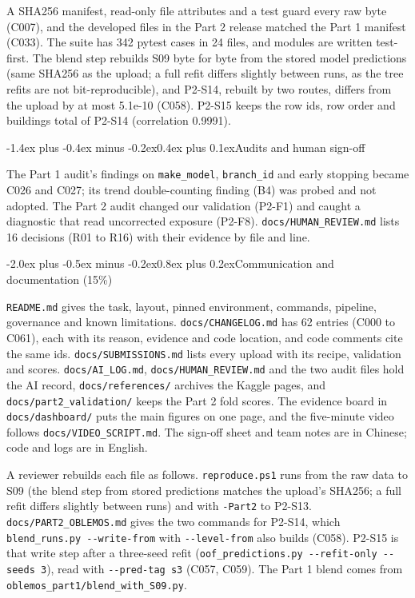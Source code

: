 \documentclass[11pt,a4paper]{article}
\makeatletter
\renewcommand\section{\@startsection{section}{1}{\z@}%
  {-2.0ex plus -0.5ex minus -0.2ex}{0.8ex plus 0.2ex}{\normalfont\large\bfseries}}
\renewcommand\subsection{\@startsection{subsection}{2}{\z@}%
  {-1.4ex plus -0.4ex minus -0.2ex}{0.4ex plus 0.1ex}{\normalfont\normalsize\bfseries}}
\newcommand{\code}[1]{\texttt{#1}}
\makeatother
\begin{document}
A SHA256 manifest, read-only file attributes and a test guard every raw byte (C007), and the developed files in the
Part 2 release matched the Part 1 manifest (C033). The suite has 342 pytest cases in 24 files, and modules are written
test-first. The blend step rebuilds S09 byte for byte from the stored model predictions (same SHA256 as the upload; a
full refit differs slightly between runs, as the tree refits are not bit-reproducible), and P2-S14, rebuilt by two
routes, differs from the upload by at most 5.1e-10 (C058). P2-S15 keeps the row ids, row order and buildings total of
P2-S14 (correlation 0.9991).

\subsection{Audits and human sign-off}

The Part 1 audit's findings on \code{make\_model}, \code{branch\_id} and early stopping became C026 and C027; its trend
double-counting finding (B4) was probed and not adopted. The Part 2 audit changed our validation (P2-F1) and caught a
diagnostic that read uncorrected exposure (P2-F8). \code{docs/HUMAN\_REVIEW.md} lists 16 decisions (R01 to R16) with
their evidence by file and line.

\section{Communication and documentation (15\%)}
\label{sec:comm}

\code{README.md} gives the task, layout, pinned environment, commands, pipeline, governance and known limitations. \code{docs/CHANGELOG.md} has 62 entries (C000 to C061), each with its reason, evidence and code
location, and code comments cite the same ids. \code{docs/SUBMISSIONS.md} lists every upload with its recipe,
validation and scores. \code{docs/AI\_LOG.md}, \code{docs/HUMAN\_REVIEW.md} and the two audit files hold the AI record,
\code{docs/references/} archives the Kaggle pages, and \code{docs/part2\_validation/} keeps the Part 2 fold scores. The
evidence board in \code{docs/dashboard/} puts the main figures on one page, and the five-minute video follows
\code{docs/VIDEO\_SCRIPT.md}. The sign-off sheet and team notes are in Chinese; code and logs are in English.

A reviewer rebuilds each file as follows. \code{reproduce.ps1} runs from the raw data to S09 (the blend step from stored predictions matches the
upload's SHA256; a full refit differs slightly between runs) and with \code{-Part2} to P2-S13. \code{docs/PART2\_OBLEMOS.md} gives the two commands for P2-S14, which
\code{blend\_runs.py -{}-write-from} with \code{-{}-level-from} also builds (C058). P2-S15 is that write step after a
three-seed refit (\code{oof\_predictions.py -{}-refit-only -{}-seeds 3}), read with \code{-{}-pred-tag s3} (C057, C059). The
Part 1 blend comes from \code{oblemos\_part1/blend\_with\_S09.py}.
\end{document}
